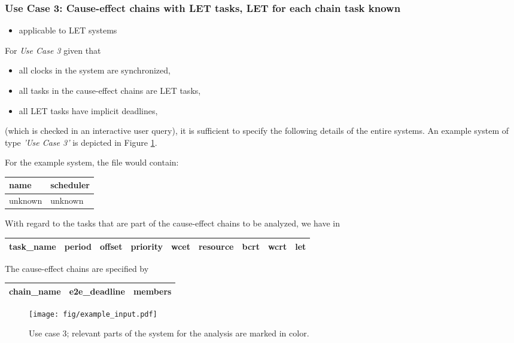 \newpage
\subsubsection{Use Case 3: Cause-effect chains with LET tasks, LET for each chain task known}
\label{sec:input-files-let}
%

\begin{tcolorbox}
\begin{itemize}[leftmargin=*, itemsep=0pt]
	\item applicable to LET systems
\end{itemize}
\end{tcolorbox}
\bigskip

For \emph{Use Case 3} given that
\begin{itemize}[leftmargin=*, itemsep=0pt]
	\item all clocks in the system are synchronized,
	\item all tasks in the cause-effect chains are LET tasks,
	\item all LET tasks have implicit deadlines,	
\end{itemize}
(which is checked in an interactive user query), 
it is sufficient to specify the following details of the entire systems.
An example system of type \emph{'Use Case 3'} is depicted in Figure \ref{fig:use-case-3}.

For the example system, the file  would contain:
\begin{center}
	\begin{tabular}{|l|l|} \hline
		\textbf{name} & \textbf{scheduler} \\ \hline
		unknown & unknown \\ \hline
	\end{tabular}
\end{center}
With regard to the tasks that are part of the cause-effect chains to be analyzed, we have in  
\begin{center}
	\begin{tabular}{|l|l|l|l|l|l|l|l|l|} \hline
		  \textbf{task\_name}  
		& \textbf{period} 
		& \textbf{offset} 
		& \textbf{priority}
		& \textbf{wcet}
		& \textbf{resource} 
		& \textbf{bcrt}		
		& \textbf{wcrt}
		& \textbf{let} \\ \hline
	\end{tabular}
\end{center}

The cause-effect chains are specified by
\begin{center}
	\begin{tabular}{|l|l|l|l|l|} \hline
		\textbf{chain\_name} 
		& \textbf{e2e\_deadline}
		& \multicolumn{3}{|l|}{\textbf{members}} \\ \hline	
	\end{tabular}
\end{center}
%
\begin{figure}[h!]
	\centering
		\texttt{[image: fig/example\_input.pdf]}
	\caption{Use case 3; relevant parts of the system for the analysis are marked in color.}
	\label{fig:use-case-3}
\end{figure}


